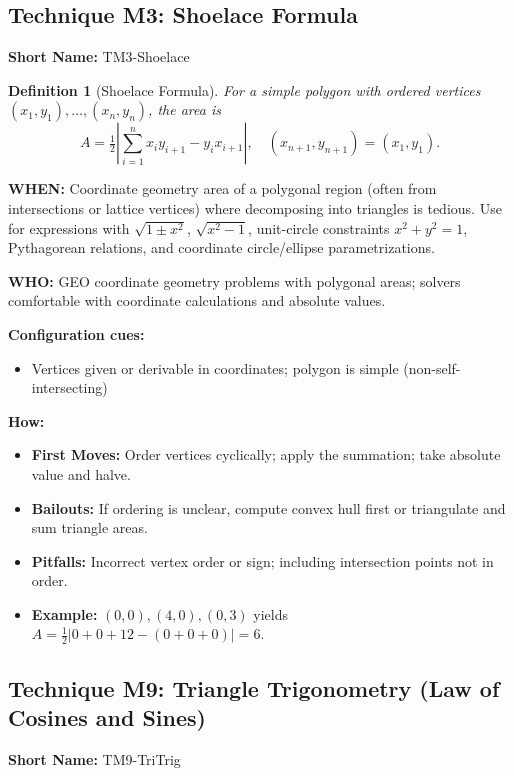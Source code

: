 \documentclass[12pt]{article}
\newtheorem{definition}{Definition}[section]
\begin{document}
\subsection{Technique M3: Shoelace Formula}
\textbf{Short Name:} TM3-Shoelace

\begin{definition}[Shoelace Formula]
For a simple polygon with ordered vertices $(x_1,y_1),\ldots,(x_n,y_n)$, the area is
\[ A = \tfrac{1}{2}\left|\sum_{i=1}^{n} x_i y_{i+1} - y_i x_{i+1}\right|, \quad (x_{n+1},y_{n+1})=(x_1,y_1). \]
\end{definition}

\textbf{WHEN:} Coordinate geometry area of a polygonal region (often from intersections or lattice vertices) where decomposing into triangles is tedious. Use for expressions with $\sqrt{1\pm x^2}$, $\sqrt{x^2-1}$, unit-circle constraints $x^2+y^2=1$, Pythagorean relations, and coordinate circle/ellipse parametrizations.

\textbf{WHO:} GEO coordinate geometry problems with polygonal areas; solvers comfortable with coordinate calculations and absolute values.

\textbf{Configuration cues:}
\begin{itemize}
    \item Vertices given or derivable in coordinates; polygon is simple (non-self-intersecting)
\end{itemize}

\textbf{How:}
\begin{itemize}
    \item \textbf{First Moves:} Order vertices cyclically; apply the summation; take absolute value and halve.
    \item \textbf{Bailouts:} If ordering is unclear, compute convex hull first or triangulate and sum triangle areas.
    \item \textbf{Pitfalls:} Incorrect vertex order or sign; including intersection points not in order.
    \item \textbf{Example:} $(0,0),(4,0),(0,3)$ yields $A=\tfrac{1}{2}|0+0+12-(0+0+0)|=6$.
\end{itemize}

\subsection{Technique M9: Triangle Trigonometry (Law of Cosines and Sines)}
\textbf{Short Name:} TM9-TriTrig
\end{document}
